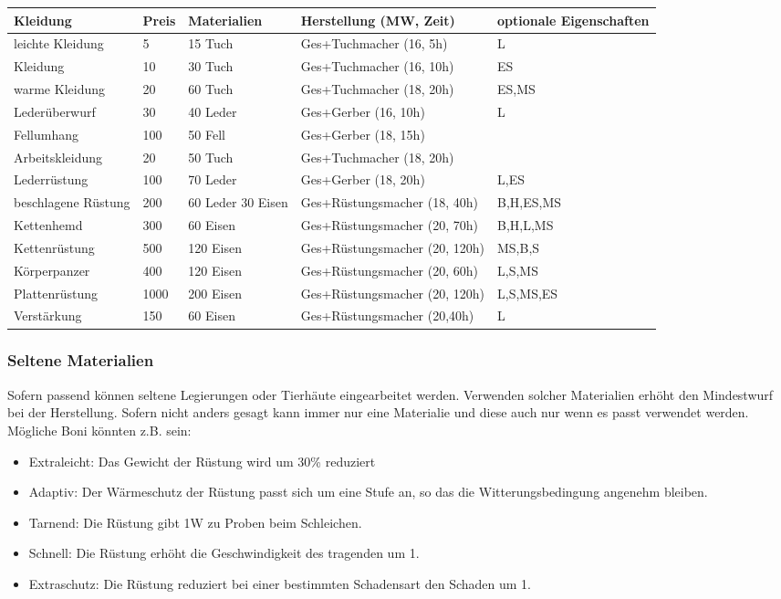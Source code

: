 \documentclass{article}
\begin{document}
\begin{small}
\begin{tabular}{|m{25mm}|m{1cm}|m{3cm}|m{5cm}|m{30mm}|}
\hline
\textbf{Kleidung}&\textbf{Preis}&\textbf{Materialien}&\textbf{Herstellung (MW, Zeit)}&\textbf{optionale Eigenschaften}\\
\hline
\hline
leichte Kleidung&5&15 Tuch&Ges+Tuchmacher (16, 5h)&L\\
\hline
Kleidung&10&30 Tuch&Ges+Tuchmacher (16, 10h)&ES\\
\hline
warme Kleidung&20&60 Tuch&Ges+Tuchmacher (18, 20h)&ES,MS\\
\hline
Lederüberwurf&30&40 Leder&Ges+Gerber (16, 10h)&L\\
\hline
Fellumhang&100&50 Fell&Ges+Gerber (18, 15h)&\\
\hline
Arbeitskleidung&20&50 Tuch&Ges+Tuchmacher (18, 20h)&\\
\hline
Lederrüstung&100&70 Leder&Ges+Gerber (18, 20h)&L,ES\\
\hline
beschlagene Rüstung&200&60 Leder 30 Eisen&Ges+Rüstungsmacher (18, 40h)&B,H,ES,MS\\
\hline
Kettenhemd&300&60 Eisen&Ges+Rüstungsmacher (20, 70h)&B,H,L,MS\\
\hline
Kettenrüstung&500&120 Eisen&Ges+Rüstungsmacher (20, 120h)&MS,B,S\\
\hline
Körperpanzer&400&120 Eisen&Ges+Rüstungsmacher (20, 60h)&L,S,MS\\
\hline
Plattenrüstung&1000&200 Eisen&Ges+Rüstungsmacher (20, 120h)&L,S,MS,ES\\
\hline
Verstärkung&150&60 Eisen&Ges+Rüstungsmacher (20,40h)&L\\
\hline
\end{tabular}
\end{small}

\subsubsection{Seltene Materialien}

Sofern passend können seltene Legierungen oder Tierhäute eingearbeitet werden. Verwenden solcher Materialien erhöht
den Mindestwurf bei der Herstellung. Sofern nicht anders gesagt kann immer nur eine Materialie und diese auch nur
wenn es passt verwendet werden. Mögliche Boni könnten z.B. sein:

\begin{itemize}
\item Extraleicht: Das Gewicht der Rüstung wird um 30\% reduziert
\item Adaptiv: Der Wärmeschutz der Rüstung passt sich um eine Stufe an, so das die Witterungsbedingung angenehm bleiben.
\item Tarnend: Die Rüstung gibt 1W zu Proben beim Schleichen.
\item Schnell: Die Rüstung erhöht die Geschwindigkeit des tragenden um 1.
\item Extraschutz: Die Rüstung reduziert bei einer bestimmten Schadensart den Schaden um 1.
\end{itemize}
\end{document}
